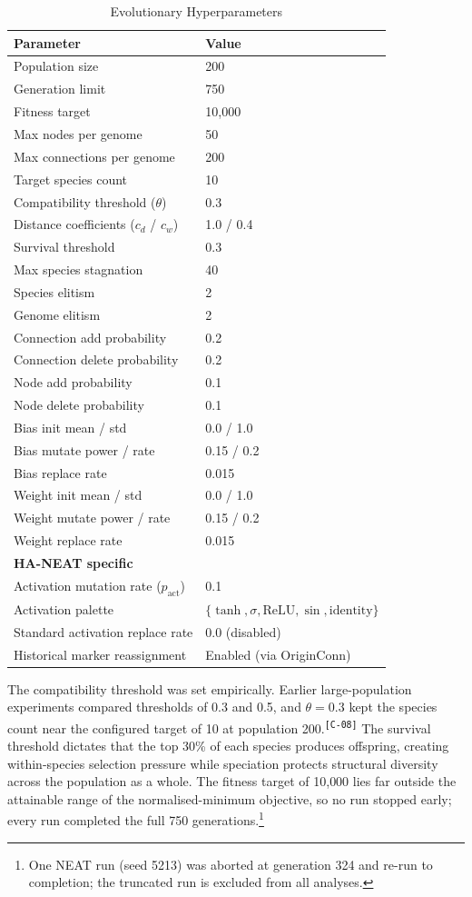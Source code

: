 \documentclass[12pt]{article}
\newcommand{\revID}[1]{\textsuperscript{\scriptsize\texttt{[#1]}}}
\newcommand{\revWeak}[2]{\textcolor{revOrange}{#2}\revID{#1}}
\begin{document}
\begin{table}[h]
\centering
\caption{Evolutionary Hyperparameters}
\label{tab:hyperparameters}
\begin{tabular}{ll}
\toprule
\textbf{Parameter} & \textbf{Value} \\
\midrule
Population size & 200 \\
Generation limit & 750 \\
Fitness target & 10{,}000 \\
Max nodes per genome & 50 \\
Max connections per genome & 200 \\
Target species count & 10 \\
Compatibility threshold ($\theta$) & 0.3 \\
Distance coefficients ($c_d$ / $c_w$) & 1.0 / 0.4 \\
Survival threshold & 0.3 \\
Max species stagnation & 40 \\
Species elitism & 2 \\
Genome elitism & 2 \\
Connection add probability & 0.2 \\
Connection delete probability & 0.2 \\
Node add probability & 0.1 \\
Node delete probability & 0.1 \\
Bias init mean / std & 0.0 / 1.0 \\
Bias mutate power / rate & 0.15 / 0.2 \\
Bias replace rate & 0.015 \\
Weight init mean / std & 0.0 / 1.0 \\
Weight mutate power / rate & 0.15 / 0.2 \\
Weight replace rate & 0.015 \\
\midrule
\textbf{HA-NEAT specific} & \\
Activation mutation rate ($p_{\text{act}}$) & 0.1 \\
Activation palette & $\{\tanh, \sigma, \text{ReLU}, \sin, \text{identity}\}$ \\
Standard activation replace rate & 0.0 (disabled) \\
Historical marker reassignment & Enabled (via OriginConn) \\
\bottomrule
\end{tabular}
\end{table}

The compatibility threshold was set empirically.
\revWeak{C-08}{Earlier large-population experiments compared thresholds of 0.3 and 0.5, and $\theta = 0.3$ kept the species count near the configured target of 10 at population 200.}
The survival threshold dictates that the top 30\% of each species produces offspring, creating within-species selection pressure while speciation protects structural diversity across the population as a whole.
The fitness target of 10{,}000 lies far outside the attainable range of the normalised-minimum objective, so no run stopped early; every run completed the full 750 generations.\footnote{One NEAT run (seed 5213) was aborted at generation 324 and re-run to completion; the truncated run is excluded from all analyses.}
\end{document}
